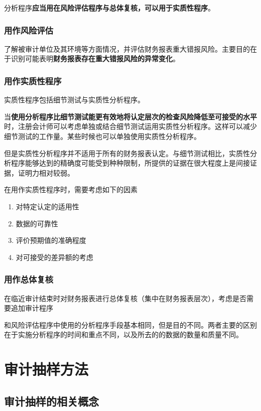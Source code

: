 \documentclass[UTF8,12pt]{ctexart}
\numberwithin{equation}{section} %
\numberwithin{figure}{section}
\numberwithin{table}{section}
\begin{document}
	分析程序\textbf{应当用在风险评估程序与总体复核，可以用于实质性程序}。
	
	\subsubsection{用作风险评估}
	了解被审计单位及其环境等方面情况，并评估财务报表重大错报风险。主要目的在于识别可能表明\textbf{财务报表存在重大错报风险的异常变化}。
	
	\subsubsection{用作实质性程序}
	实质性程序包括细节测试与实质性分析程序。
	
	当\textbf{使用分析程序比细节测试能更有效地将认定层次的检查风险降低至可接受的水平}时，注册会计师可以考虑单独或结合细节测试运用实质性分析程序。这样可以减少细节测试的工作量。某些时候也可以单独使用实质性分析程序。
	
	但是实质性分析程序并不适用于所有的财务报表认定。与细节测试相比，实质性分析程序能够达到的精确度可能受到种种限制，所提供的证据在很大程度上是间接证据，证明力相对较弱。
	
	在用作实质性程序时，需要考虑如下的因素
	\begin{enumerate}
		\item 对特定认定的适用性
		
		\item 数据的可靠性
		
		\item 评价预期值的准确程度
		
		\item 对可接受的差异额的考虑
	\end{enumerate}
	
	
	\subsubsection{用作总体复核}
	在临近审计结束时对财务报表进行总体复核（集中在财务报表层次），考虑是否需要追加审计程序
	
	和风险评估程序中使用的分析程序手段基本相同，但是目的不同。两者主要的区别在于实施分析程序的时间和重点不同，以及所去的的数据的数量和质量不同。
	
	\newpage
	\section{审计抽样方法}
	\subsection{审计抽样的相关概念}
\end{document}
